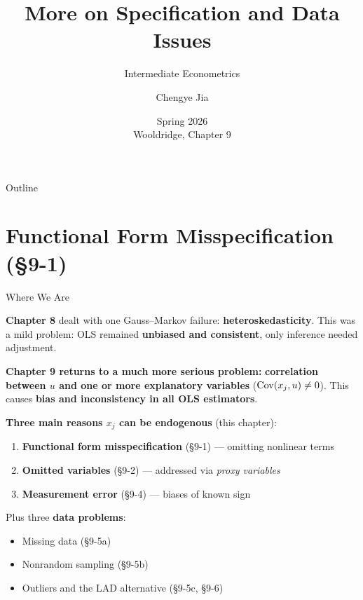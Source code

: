 \documentclass[aspectratio=169, 12pt]{beamer}
\title[L8: Specification \& Data Issues]{More on Specification and Data Issues}
\subtitle{Intermediate Econometrics}
\author[SUFE Econometrics]{Chengye Jia}
\institute{%
  Department of Economics \\
  Shandong University of Finance and Economics}
\date{Spring 2026 \\ \smallskip \scriptsize Wooldridge, Chapter 9}
\begin{document}

\begin{frame}[plain]
  \titlepage
\end{frame}

\begin{frame}[shrink=10]{Outline}
  \tableofcontents
\end{frame}

\section{Functional Form Misspecification (\S9-1)}

\begin{frame}[shrink=15]{Where We Are}

  \textbf{Chapter 8} dealt with one Gauss--Markov failure: \textbf{heteroskedasticity}.
  This was a mild problem: OLS remained \textbf{unbiased and consistent}, only inference
  needed adjustment.

  \begin{keybox}
    \textbf{Chapter 9 returns to a much more serious problem:} \textbf{correlation between $u$
    and one or more explanatory variables} ($\operatorname{Cov}(x_j, u) \neq 0$). This causes
    \textbf{bias and inconsistency in all OLS estimators}.
  \end{keybox}

  \textbf{Three main reasons $x_j$ can be endogenous} (this chapter):
  \begin{enumerate}\setlength{\itemsep}{2pt}
    \item \textbf{Functional form misspecification} (§9-1) — omitting nonlinear terms
    \item \textbf{Omitted variables} (§9-2) — addressed via \emph{proxy variables}
    \item \textbf{Measurement error} (§9-4) — biases of known sign
  \end{enumerate}

  \smallskip
  Plus three \textbf{data problems}:
  \begin{itemize}\setlength{\itemsep}{2pt}
    \item Missing data (§9-5a)
    \item Nonrandom sampling (§9-5b)
    \item Outliers and the LAD alternative (§9-5c, §9-6)
  \end{itemize}

\end{frame}
\end{document}
